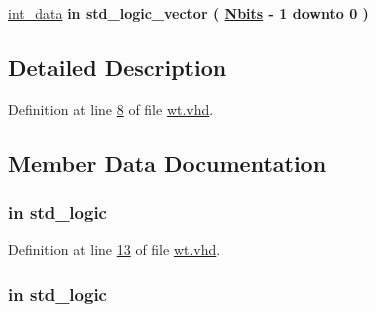 \begin{DoxyCompactItemize}
\item 
\hyperlink{classwt_a9e24e3e60e3f24bab11f642255ba1bd4}{int\+\_\+data}  {\bfseries {\bfseries \textcolor{keywordflow}{in}\textcolor{vhdlchar}{ }}} {\bfseries \textcolor{comment}{std\+\_\+logic\+\_\+vector}\textcolor{vhdlchar}{ }\textcolor{vhdlchar}{(}\textcolor{vhdlchar}{ }\textcolor{vhdlchar}{ }\textcolor{vhdlchar}{ }\textcolor{vhdlchar}{ }{\bfseries \hyperlink{classwt_a8b45761acb3f2e683677c4eb77d442b0}{Nbits}} \textcolor{vhdlchar}{-\/}\textcolor{vhdlchar}{ } \textcolor{vhdldigit}{1} \textcolor{vhdlchar}{ }\textcolor{keywordflow}{downto}\textcolor{vhdlchar}{ }\textcolor{vhdlchar}{ } \textcolor{vhdldigit}{0} \textcolor{vhdlchar}{ }\textcolor{vhdlchar}{)}\textcolor{vhdlchar}{ }} 
\end{DoxyCompactItemize}


\subsection{Detailed Description}


Definition at line \hyperlink{wt_8vhd_source_l00008}{8} of file \hyperlink{wt_8vhd_source}{wt.\+vhd}.



\subsection{Member Data Documentation}
\hypertarget{classwt_a4a4609c199d30b3adebbeb3a01276ec5}{}
\subsubsection[{clk}]{ {\bfseries \textcolor{keywordflow}{in}\textcolor{vhdlchar}{ }} {\bfseries \textcolor{comment}{std\+\_\+logic}\textcolor{vhdlchar}{ }} \hspace{0.3cm}{\ttfamily [Port]}}\label{classwt_a4a4609c199d30b3adebbeb3a01276ec5}


Definition at line \hyperlink{wt_8vhd_source_l00013}{13} of file \hyperlink{wt_8vhd_source}{wt.\+vhd}.

\hypertarget{classwt_adcf9c6f5161d039addbda5819bee64a3}{}
\subsubsection[{en}]{ {\bfseries \textcolor{keywordflow}{in}\textcolor{vhdlchar}{ }} {\bfseries \textcolor{comment}{std\+\_\+logic}\textcolor{vhdlchar}{ }} \hspace{0.3cm}{\ttfamily [Port]}}\label{classwt_adcf9c6f5161d039addbda5819bee64a3}


